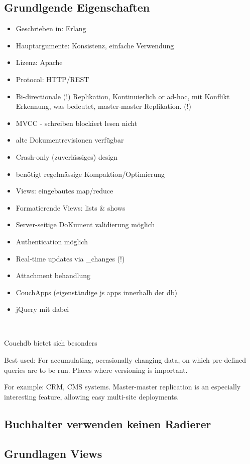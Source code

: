 \subsection{Grundlgende Eigenschaften}


\begin{itemize}
\item Geschrieben in: Erlang
\item Hauptargumente: Konsistenz, einfache Verwendung
\item Lizenz: Apache
\item Protocol: HTTP/REST
\item Bi-directionale (!) Replikation,
    Kontinuierlich or ad-hoc,
    mit Konflikt Erkennung,
    was bedeutet, master-master Replikation. (!)

\item MVCC - schreiben blockiert lesen nicht
\item alte Dokumentrevisionen verfügbar
\item Crash-only (zuverlässiges) design
\item benötigt regelmässige Kompaktion/Optimierung
\item Views: eingebautes map/reduce
\item Formatierende Views: lists \& shows
\item Server-seitige DoKument validierung möglich
\item Authentication möglich
\item Real-time updates via \_changes (!)
\item Attachment behandlung
\item CouchApps (eigenständige js apps innerhalb der db)
\item jQuery mit dabei
\end{itemize}
~ \cite{web:db-compare}


Couchdb bietet sich besonders 

Best used: For accumulating, occasionally changing data, on which pre-defined queries are to be run. Places where versioning is important.

For example: CRM, CMS systems. Master-master replication is an especially interesting feature, allowing easy multi-site deployments. 

\subsection{Buchhalter verwenden keinen Radierer}

\subsection{Grundlagen Views}
